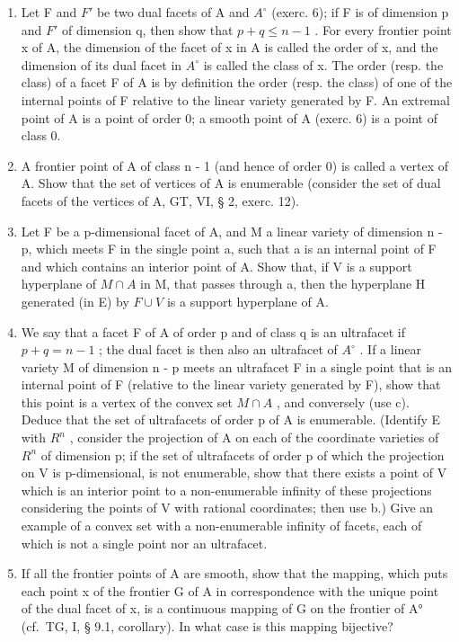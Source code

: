 \begin{enumerate}
\def\labelenumi{\alph{enumi})}
\item
  Let F and \(F'\) be two dual facets of A and \(A^{\circ}\) (exerc. 6); if F is of dimension p and \(F'\) of dimension q, then show that \(p + q \leqslant n - 1\) . For every frontier point x of A, the dimension of the facet of x in A is called the order of x, and the dimension of its dual facet in \(A^{\circ}\) is called the class of x. The order (resp. the class) of a facet F of A is by definition the order (resp. the class) of one of the internal points of F relative to the linear variety generated by F. An extremal point of A is a point of order 0; a smooth point of A (exerc. 6) is a point of class 0.
\item
  A frontier point of A of class n - 1 (and hence of order 0) is called a vertex of A. Show that the set of vertices of A is enumerable (consider the set of dual facets of the vertices of A, GT, VI, § 2, exerc. 12).
\item
  Let F be a p-dimensional facet of A, and M a linear variety of dimension n - p, which meets F in the single point a, such that a is an internal point of F and which contains an interior point of A. Show that, if V is a support hyperplane of \(M \cap A\) in M, that passes through a, then the hyperplane H generated (in E) by \(F \cup V\) is a support hyperplane of A.
\item
  We say that a facet F of A of order p and of class q is an ultrafacet if \(p + q = n - 1\) ; the dual facet is then also an ultrafacet of \(A^{\circ}\) . If a linear variety M of dimension n - p meets an ultrafacet F in a single point that is an internal point of F (relative to the linear variety generated by F), show that this point is a vertex of the convex set \(M \cap A\) , and conversely (use c). Deduce that the set of ultrafacets of order p of A is enumerable. (Identify E with \(R^{n}\) , consider the projection of A on each of the coordinate varieties of \(R^{n}\) of dimension p; if the set of ultrafacets of order p of which the projection on V is p-dimensional, is not enumerable, show that there exists a point of V which is an interior point to a non-enumerable infinity of these projections considering the points of V with rational coordinates; then use b.) Give an example of a convex set with a non-enumerable infinity of facets, each of which is not a single point nor an ultrafacet.
\item
  If all the frontier points of A are smooth, show that the mapping, which puts each point x of the frontier G of A in correspondence with the unique point of the dual facet of x, is a continuous mapping of G on the frontier of A° (cf.~TG, I, § 9.1, corollary). In what case is this mapping bijective?
\end{enumerate}

